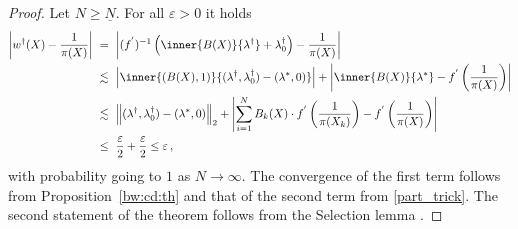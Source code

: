 \begin{proof}
  Let
  $N\ge\underline{N}$.
  For all $\varepsilon>0$ it holds
\begin{align}
  \begin{split}
  \left| 
  w^\dagger(X)
  -
  \frac{1}{\pi(X)}
  \right|
  &
  \ 
  =
  \ 
  \left| 
  (f^{'})^{-1}
  \left( 
    \inner{B(X)}
    {\lambda^\dagger}
    +
    \lambda_0^\dagger
  \right)
  -
  \frac{1}{\pi(X)}
  \right|
  \\
  &
  \ 
  \lesssim
  \ 
  \left| 
    \inner{(B(X),1)}
    {
      (\lambda^\dagger,\lambda_0^\dagger)
      -
      (\lambda^*,0)
    }
  \right|
  +
  \left| 
    \inner{B(X)}
    {
      \lambda^*
      }
    -
    f^{'}
    \left( 
  \frac{1}{\pi(X)}
    \right)
  \right|
  \\
  &
  \ 
  \lesssim
  \ 
  \norm{
      (\lambda^\dagger,\lambda_0^\dagger)
      -
      (\lambda^*,0)
}_2
  +
  \left| 
  \sum_{i=1}^{N} 
  B_k(X)
  \cdot
    f^{'}
    \left( 
  \frac{1}{\pi(X_k)}
    \right)
    -
    f^{'}
    \left( 
  \frac{1}{\pi(X)}
    \right)
  \right|
  \\
  &
  \ 
  \le
  \ 
  \frac{\varepsilon}{2}
+
  \frac{\varepsilon}{2}
  \le
  \varepsilon
  \,,
\end{split}
\end{align}
with probability going to $1$ as $N\to\infty$.
The convergence of the first term follows from Proposition~\ref{bw:cd:th} and that of the second term from \eqref{part_trick}.
The second statement of the theorem follows from the Selection lemma
\cite[A.1.4.]{Steinwart2008}.
\end{proof}
